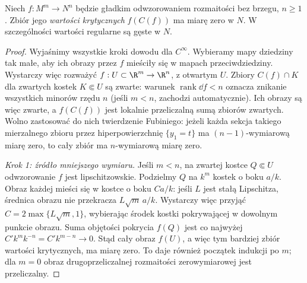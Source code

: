 \begin{twierdzenie}
\label{thm:sard}
Niech $f:M^m\to N^n$ będzie gładkim odwzorowaniem
rozmaitości bez brzegu, $n\geq1$. Zbiór jego
\emph{wartości krytycznych} $f(C(f))$ ma miarę zero
w $N$. W szczególności wartości regularne są gęste
w $N$.
\end{twierdzenie}

\begin{proof}
Wyjaśnimy wszystkie kroki dowodu dla $C^\infty$.
Wybieramy mapy dziedziny tak małe, aby ich obrazy przez
$f$ mieściły się w mapach przeciwdziedziny. Wystarczy więc
rozważyć $f:U\subset\R^m\to\R^n$, z otwartym $U$. Zbiory
$C(f)\cap K$ dla zwartych kostek $K\Subset U$
są zwarte: warunek $\operatorname{rank}\dd f<n$
oznacza znikanie wszystkich minorów rzędu $n$
(jeśli $m<n$, zachodzi automatycznie). Ich obrazy
są więc zwarte, a $f(C(f))$ jest lokalnie
przeliczalną sumą zbiorów zwartych. Wolno
zastosować do nich twierdzenie Fubiniego:
jeżeli każda sekcja takiego mierzalnego zbioru
przez hiperpowierzchnię $\{y_1=t\}$ ma
$(n-1)$-wymiarową miarę zero, to cały zbiór
ma $n$-wymiarową miarę zero.

\emph{Krok 1: źródło mniejszego wymiaru.}
Jeśli $m<n$, na zwartej kostce $Q\Subset U$
odwzorowanie $f$ jest lipschitzowskie.
Podzielmy $Q$ na $k^m$ kostek o boku $a/k$.
Obraz każdej mieści się w kostce o boku
$Ca/k$: jeśli $L$ jest stałą Lipschitza, średnica
obrazu nie przekracza $L\sqrt m\,a/k$.
Wystarczy więc przyjąć $C=2\max\{L\sqrt m,1\}$,
wybierając środek kostki pokrywającej w dowolnym
punkcie obrazu. Suma objętości pokrycia
$f(Q)$ jest co najwyżej
$C'k^m k^{-n}=C'k^{m-n}\to0$.
Stąd cały obraz $f(U)$, a więc tym bardziej
zbiór wartości krytycznych, ma miarę zero.
To daje również początek indukcji po $m$;
dla $m=0$ obraz drugoprzeliczalnej
rozmaitości zerowymiarowej jest przeliczalny.


\end{proof}
